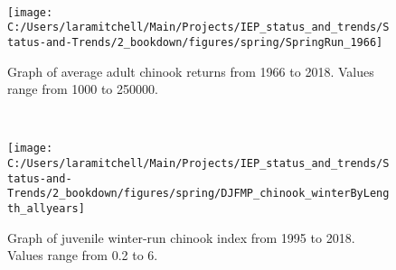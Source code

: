 \documentclass[
]{book}
\begin{document}
\begin{panel-grid}
\begin{columns-nocenter}
\begin{column800}
\begin{expand}
\end{expand}

\end{column800}

\begin{column40}

~

\end{column40}

\begin{column800}

\begin{expand}

\begin{figure}
\texttt{[image: C:/Users/laramitchell/Main/Projects/IEP\_status\_and\_trends/Status-and-Trends/2\_bookdown/figures/spring/SpringRun\_1966]} \caption{Graph of average adult chinook returns from 1966 to 2018. Values range from 1000 to 250000.}\label{fig:unnamed-chunk-36}
\end{figure}

\end{expand}

\end{column800}

\begin{column40}

~

\end{column40}

\begin{column800}

\begin{expand}

\begin{figure}
\texttt{[image: C:/Users/laramitchell/Main/Projects/IEP\_status\_and\_trends/Status-and-Trends/2\_bookdown/figures/spring/DJFMP\_chinook\_winterByLength\_allyears]} \caption{Graph of juvenile winter-run chinook index from 1995 to 2018. Values range from 0.2 to 6.}\label{fig:unnamed-chunk-37}
\end{figure}

\end{expand}

\end{column800}

\end{columns-nocenter}

\begin{columns-nocenter}

\begin{column800}


\end{column800}
\end{columns-nocenter}
\end{panel-grid}
\end{document}

